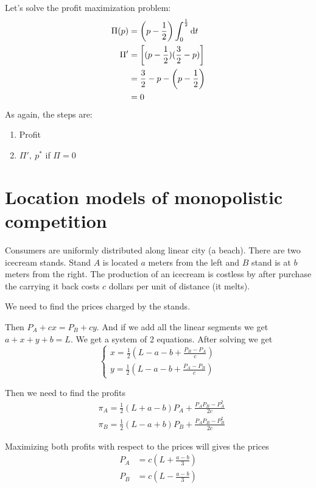 \documentclass[a4paper, 10pt]{article}
\begin{document}
Let's solve the profit maximization problem:
\begin{equation*}
    \begin{aligned}
        \Pi(p)&=\left(p-\frac{1}{2}\right)\int_0^{\frac{1}{2}}\text{d}t\\
        \Pi^{\prime}&=\left[(p-\frac{1}{2})(\frac{3}{2}-p)\right]\\
        &=\frac{3}{2}-p-\left(p-\frac{1}{2}\right)\\
        &=0
    \end{aligned}
\end{equation*}
As again, the steps are:
\begin{enumerate}
    \item Profit
    \item $\Pi',\ p^*$ if $\Pi=0$
\end{enumerate}

\section{Location models of monopolistic competition}
Consumers are uniformly distributed along linear city (a beach). There are two icecream stands. Stand $A$ is located $a$ meters from the left and $B$ stand is at $b$ meters from the right. The production of an icecream is costless by after purchase the carrying it back costs $c$ dollars per unit of distance (it melts).

We need to find the prices charged by the stands.

Then $P_A+c x=P_B+c y$. And if we add all the linear segments we get $a+x+y+b=L$.
We get a system of 2 equations. After solving we get
$$
\left\{\begin{array}{l}
x=\frac{1}{2}\left(L-a-b+\frac{P_B-P_A}{c}\right) \\
y=\frac{1}{2}\left(L-a-b+\frac{P_A-P_B}{c}\right)
\end{array}\right.
$$

Then we need to find the profits
$$
\begin{aligned}
& \pi_A=\frac{1}{2}(L+a-b) P_A+\frac{P_A P_B-P_A^2}{2 c} \\
& \pi_B=\frac{1}{2}(L-a+b) P_B+\frac{P_A P_B-P_B^2}{2 c}
\end{aligned}
$$

Maximizing both profits with respect to the prices will gives the prices
$$
\begin{aligned}
P_A & =c\left(L+\frac{a-b}{3}\right) \\
P_B & =c\left(L-\frac{a-b}{3}\right)
\end{aligned}
$$
\end{document}
